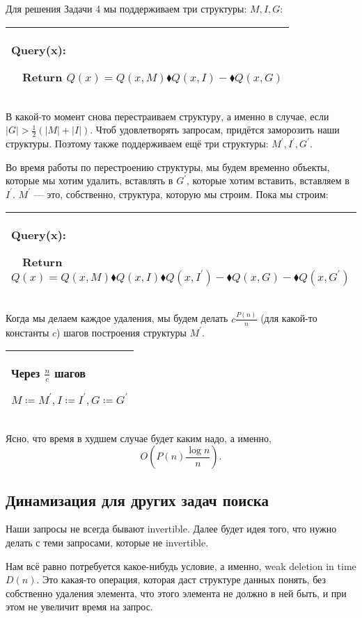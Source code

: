 Для решения Задачи 4 мы поддерживаем три структуры: $M,I,G$:

\begin{tabular}{|p{8cm}|}
\hline
Query(x):

$\quad$Return $Q(x)=Q(x,M)\blacklozenge Q(x,I)-\blacklozenge Q(x,G)$\\
\hline
\end{tabular}


В какой-то момент снова перестраиваем структуру, а именно в случае, если $|G|>\frac{1}{2}(|M|+|I|)$. Чтоб удовлетворять запросам, придётся заморозить наши структуры. Поэтому также поддерживаем ещё три структуры: $M^\prime,I^\prime,G^\prime$.

Во время работы по перестроению структуры, мы будем временно объекты, которые мы хотим удалить, вставлять в $G^\prime$, которые хотим вставить, вставляем в $I^\prime$. $M^\prime$ — это, собственно, структура, которую мы строим. Пока мы строим:

\begin{tabular}{|p{11cm}|}
\hline
Query(x):

$\quad$Return $Q(x)=Q(x,M)\blacklozenge Q(x,I) \blacklozenge Q(x,I^\prime)-\blacklozenge Q(x,G)-\blacklozenge Q(x,G^\prime)$\\
\hline
\end{tabular}


Когда мы делаем каждое удаления, мы будем делать $c\frac{P(n)}{n}$ (для какой-то константы $c$) шагов построения структуры $M^\prime$.

\begin{tabular}{|p{4cm}|}
\hline
Через $\frac{n}{c}$ шагов

$M \coloneqq M^\prime,I \coloneqq I^\prime,G \coloneqq G^\prime$\\
\hline
\end{tabular}


Ясно, что время в худшем случае будет каким надо, а именно,
$$O\left(P(n)\frac{\log n}{n} \right).$$

\subsection{Динамизация для других задач поиска}

Наши запросы не всегда бывают invertible. Далее будет идея того, что нужно делать с теми запросами, которые не invertible.

Нам всё равно потребуется какое-нибудь условие, а именно, weak deletion in time $D(n)$. Это какая-то операция, которая даст структуре данных понять, без собственно удаления элемента, что этого элемента не должно в ней быть, и при этом не увеличит время на запрос.

